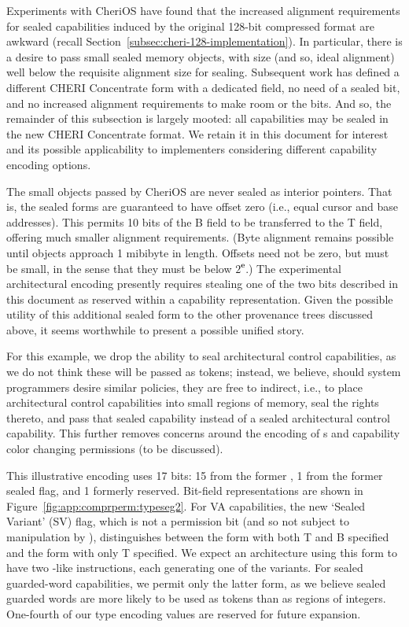 Experiments with CheriOS have found that the increased alignment requirements
for sealed capabilities induced by the original 128-bit compressed format are
awkward (recall Section~\ref{subsec:cheri-128-implementation}).  In particular,
there is a desire to pass small sealed memory objects, with size (and so,
ideal alignment) well below the requisite alignment size for sealing.
Subsequent work has defined a different CHERI Concentrate form with a dedicated
\cotype{} field, no need of a sealed bit, and no increased alignment
requirements to make room or the \cotype{} bits.  And so, the remainder of this
subsection is largely mooted: all capabilities may be sealed in the new CHERI
Concentrate format.  We retain it in this document for interest and its
possible applicability to implementers considering different capability
encoding options.

The small objects passed by CheriOS are never sealed as interior pointers.
That is, the sealed forms are guaranteed to have offset zero (i.e., equal
cursor and base addresses).  This permits 10 bits of the B field to be
transferred to the T field, offering much smaller alignment requirements.
(Byte alignment remains possible until objects approach 1 mibibyte in length.
Offsets need not be zero, but must be small, in the sense that they must be
below $2^{\mathbf{e}}$.)  The experimental architectural encoding presently
requires stealing one of the two bits described in this document as reserved
within a capability representation.  Given the possible utility of this
additional sealed form to the other provenance trees discussed above, it seems
worthwhile to present a possible unified story.

For this example, we drop the ability to seal architectural control
capabilities, as we do not think these will be passed as tokens; instead, we
believe, should system programmers desire similar policies, they are free to
indirect, i.e., to place architectural control capabilities into small
regions of memory, seal the rights thereto, and pass that sealed capability
instead of a sealed architectural control capability.
This further removes concerns around the encoding of \cotype{}s and capability
color changing permissions (to be discussed).

This illustrative
encoding uses 17 bits: 15 from the former \cmuperms{}, 1 from the
former sealed flag, and 1 formerly reserved.  Bit-field representations are
shown in Figure~\ref{fig:app:comprperm:typeseg2}.  For VA capabilities, the new
`Sealed Variant' (SV) flag, which is not a permission bit (and so not subject
to manipulation by ), distinguishes between the form with
both T and B specified and the form with only T specified.  We expect an
architecture using this form to have two -like instructions,
each generating one of the variants.  For sealed guarded-word capabilities, we
permit only the latter form, as we believe sealed guarded words are more likely
to be used as tokens than as regions of integers.  One-fourth of our type
encoding values are reserved for future expansion.

